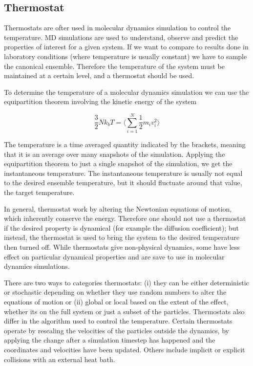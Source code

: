 \subsection{Thermostat}

Thermostats are ofter used in molecular dynamics simulation to control the temperature. MD simulations are used to understand, observe and predict the properties of interest for a given system. If we want to compare to results done in laboratory conditions (where temperature is usually constant) we have to sample the canonical ensemble. Therefore the temperature of the system must be maintained at a certain level, and a thermostat should be used.

To determine the temperature of a molecular dynamics simulation we can use the equipartition theorem involving the kinetic energy of the system

\begin{equation}
  \frac{3}{2} N k_b T = \langle \sum_{i=1}^{N} \frac{1}{2} m_i v_{i}^2 \rangle
\end{equation}

The temperature is a time averaged quantity indicated by the brackets, meaning that it is an average over many snapshots of the simulation. Applying the equipartition theorem to just a single snapshot of the simulation, we get the instantaneous temperature. The instantaneous temperature is usually not equal to the desired ensemble temperature, but it should fluctuate around that value, the target temperature.

In general, thermostat work by altering the Newtonian equations of motion, which inherently conserve the energy. Therefore one should not use a thermostat if the desired property is dynamical (for example the diffusion coefficient); but instead, the thermostat is used to bring the system to the desired temperature then turned off. While thermostats give non-physical dynamics, some have less effect on particular dynamical properties and are save to use in molecular dynamics simulations.

There are two ways to categories thermostats: (i) they can be either deterministic or stochastic depending on whether they use random numbers to alter the equations of motion or (ii) global or local based on the extent of the effect, whether its on the full system or just a subset of the particles. Thermostats also differ in the algorithm used to control the temperature. Certain thermostats operate by rescaling the velocities of the particles outside the dynamics, by applying the change after a simulation timestep has happened and the coordinates and velocities have been updated. Others include implicit or explicit collisions with an external heat bath.

